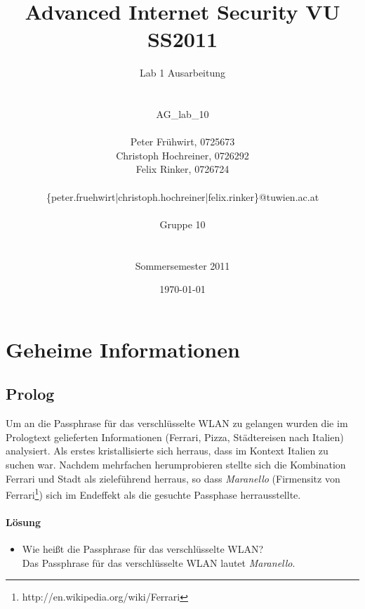 \documentclass[12pt]{article}
\title{Advanced Internet Security VU SS2011}
\author{
	Lab 1 Ausarbeitung\\
	\\
	\\
	AG\_lab\_10\\
	\\
	Peter Fr\"uhwirt, 0725673  \\
	Christoph Hochreiner, 0726292 \\
	Felix Rinker, 0726724 \\
	\\
	\{peter.fruehwirt|christoph.hochreiner|felix.rinker\}@tuwien.ac.at\\
	\\
	Gruppe 10\\
	\\
	\\
	Sommersemester 2011
}
\date{\today}
\begin{document}
\maketitle

\newpage
\tableofcontents
\newpage
\listoffigures

\lstlistoflistings
\newpage

\section{Geheime Informationen}

\subsection{Prolog}

Um an die Passphrase für das verschlüsselte WLAN zu gelangen wurden die im Prologtext gelieferten Informationen (Ferrari, Pizza, Städtereisen nach Italien) analysiert. Als erstes kristallisierte sich herraus, dass im Kontext Italien zu suchen war. Nachdem mehrfachen herumprobieren stellte sich die Kombination Ferrari und Stadt als zieleführend herraus, so dass \textit{Maranello} (Firmensitz von Ferrari\footnote{http://en.wikipedia.org/wiki/Ferrari}) sich im Endeffekt als die gesuchte Passphase herrausstellte.

\paragraph{Lösung}
\begin{itemize}
	\item Wie heißt die Passphrase für das verschlüsselte WLAN? \\
		Das  Passphrase für das verschlüsselte WLAN lautet \textit{Maranello}.
\end{itemize}
\end{document}
